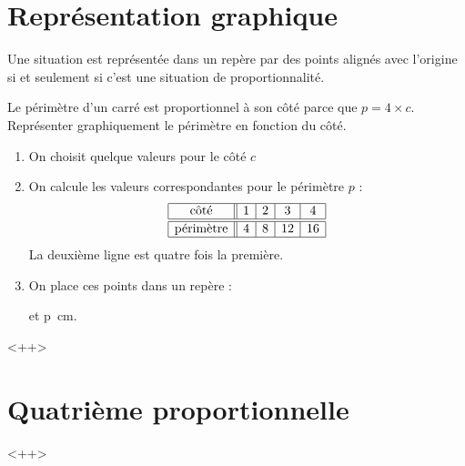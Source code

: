 


\section{Représentation graphique}

\begin{propriete}
    Une situation est représentée dans un repère par des points alignés avec l'origine si et seulement si c'est une situation de proportionnalité.
\end{propriete}

\begin{example}
    Le périmètre d'un carré est proportionnel à son côté parce que \( p=4\times c\). Représenter graphiquement le périmètre en fonction du côté.

    \begin{enumerate}
        \item
            On choisit quelque valeurs pour le côté \( c\)
        \item
            On calcule les valeurs correspondantes pour le périmètre \( p\) :
            \begin{equation*}
                \begin{array}[]{|c||c|c|c|c|}
                    \hline
                    \text{côté}&1&2&3&4\\
                    \hline\hline
                    \text{périmètre}&4&8&12&16\\
                    \hline
                \end{array}
            \end{equation*}
            La deuxième ligne est quatre fois la première.
        \item
            On place ces points dans un repère :
            \begin{center}

            \end{center}
            et \SI{p}{\centi\meter}.
    \end{enumerate}

\end{example}
<++>

\section{Quatrième proportionnelle}

<++>
